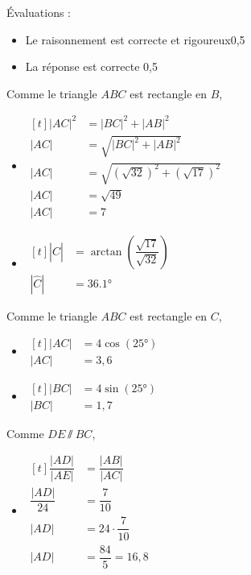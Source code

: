 \documentclass[../partie2.tex]{subfiles}
\begin{document}
\begin{solution}
    Évaluations :
    \begin{itemize}
        \item Le raisonnement est correcte et rigoureux\hfill 0,5
        \item La réponse est correcte \hfill 0,5
    \end{itemize}
\begin{tasks}
    \task
    Comme le triangle $ABC$ est rectangle en $B$,
    \begin{itemize}
        \item
        $
        \begin{aligned}[t]
            |AC|^2 &= |BC|^2 + |AB|^2\\
            |AC| &= \sqrt{|BC|^2 + |AB|^2}\\
            |AC| &= \sqrt{\left(\sqrt{32}\right)^2 + \left(\sqrt{17}\right)^2}\\
            |AC| &= \sqrt{49}\\
            |AC| &= 7
        \end{aligned}
        $
        \item
        $
        \begin{aligned}[t]
            |\widehat{C}| &= \arctan\left(\dfrac{\sqrt{17}}{\sqrt{32}}\right)\\
            |\widehat{C}| &= \ang{36,1} 
        \end{aligned}
        $ 
    \end{itemize}

    \task
    Comme le triangle $ABC$ est rectangle en $C$,
    \begin{itemize}
        \item 
        $
        \begin{aligned}[t]
            |AC| &= 4 \cos\left(\ang{25}\right)\\
            |AC| &= 3,6
        \end{aligned}
        $ 
        \item 
        $
        \begin{aligned}[t]
            |BC| &= 4\sin\left(\ang{25}\right)\\
            |BC| &= 1,7
        \end{aligned}
        $ 
    \end{itemize}

    \task 
    Comme $DE \sslash BC$,
    \begin{itemize}
        \item 
        $
        \begin{aligned}[t]
            \dfrac{|AD|}{|AE|} &= \dfrac{|AB|}{|AC|}\\
            \dfrac{|AD|}{24} &= \dfrac{7}{10}\\
            |AD| &= 24 \cdot \dfrac{7}{10}\\
            |AD| &= \dfrac{84}{5} = 16,8
        \end{aligned}
        $ 


\end{itemize}
\end{tasks}
\end{solution}
\end{document}
